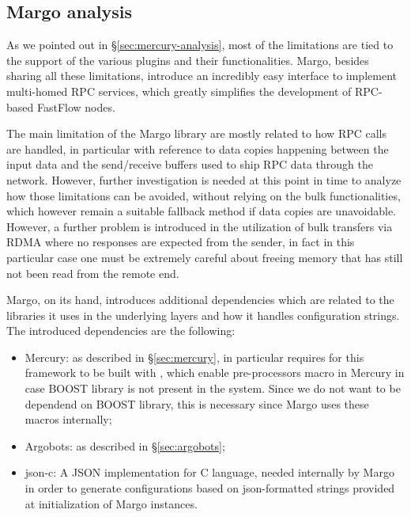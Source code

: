 \subsection{Margo analysis}
As we pointed out in \S\ref{sec:mercury-analysis}, most of the limitations are tied to the support of the various plugins and their functionalities. Margo, besides sharing all these limitations, introduce an incredibly easy interface to implement multi-homed RPC services, which greatly simplifies the development of RPC-based FastFlow nodes.\newline

The main limitation of the Margo library are mostly related to how RPC calls are handled, in particular with reference to data copies happening between the input data and the send/receive buffers used to ship RPC data through the network. However, further investigation is needed at this point in time to analyze how those limitations can be avoided, without relying on the bulk functionalities, which however remain a suitable fallback method if data copies are unavoidable. However, a further problem is introduced in the utilization of bulk transfers via RDMA where no responses are expected from the sender, in fact in this particular case one must be extremely careful about freeing memory that has still not been read from the remote end.\newline

Margo, on its hand, introduces additional dependencies which are related to the libraries it uses in the underlying layers and how it handles configuration strings. The introduced dependencies are the following:
\begin{itemize}
    \item Mercury: as described in \S\ref{sec:mercury}, in particular requires for this framework to be built with , which enable pre-processors macro in Mercury in case BOOST library is not present in the system. Since we do not want to be dependend on BOOST library, this is necessary since Margo uses these macros internally;
    \item Argobots: as described in \S\ref{sec:argobots};
    \item json-c: A JSON implementation for C language\cite{jsonc}, needed internally by Margo in order to generate configurations based on json-formatted strings provided at initialization of Margo instances.
\end{itemize}
